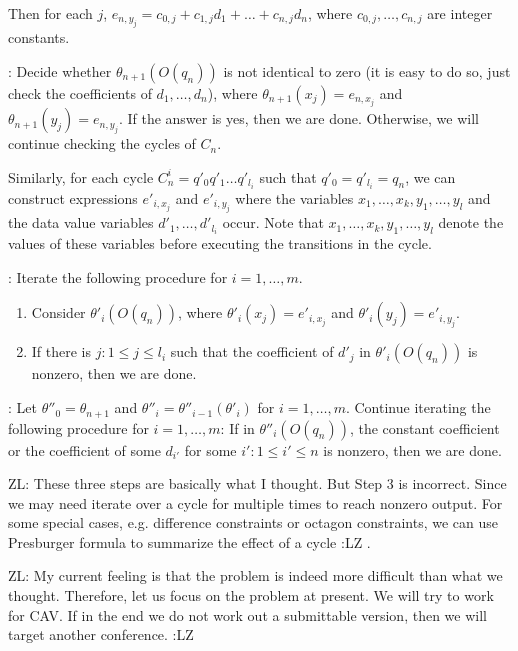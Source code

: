 \documentclass[runningheads,a4paper]{llncs}
\newcommand{\zhilin}[1]{\color{cyan} {ZL: #1 :LZ} \color{black}}
\begin{document}
Then for each $j$, $e_{n,y_j} = c_{0,j} + c_{1,j} d_1 + \dots + c_{n,j} d_n$, where $c_{0,j},\dots, c_{n,j}$ are integer constants.

\smallskip

: Decide whether $\theta_{n+1}(O(q_n))$ is not identical to zero (it is easy to do so, just check the coefficients of $d_1,\dots,d_n$), where $\theta_{n+1}(x_j)=e_{n,x_j}$ and $\theta_{n+1}(y_j)=e_{n,y_j}$. If the answer is yes, then we are done. Otherwise, we will continue checking the cycles of $C_n$.

Similarly, for each cycle $C^i_n = q'_0 q'_1 \dots q'_{l_i}$ such that $q'_0 = q'_{l_i}=q_n$, we can construct expressions $e'_{i,x_j}$ and $e'_{i,y_j}$ where the variables $x_1,\dots,x_k,y_1,\dots,y_l$ and the data value variables $d'_1,\dots,d'_{l_i}$ occur. Note that $x_1,\dots,x_k,y_1,\dots,y_l$ denote the values of these variables before executing the transitions in the cycle.

\smallskip

: Iterate the following procedure for $i = 1, \dots, m$.
\begin{enumerate}
\item Consider $\theta'_i(O(q_n))$, where $\theta'_i(x_j)=e'_{i,x_j}$ and $\theta'_i(y_j)=e'_{i,y_j}$. 
%
\item If there is $j: 1 \le j \le l_i$ such that the coefficient of $d'_j$ in $\theta'_i(O(q_n))$ is nonzero, then we are done. 
\end{enumerate}

\smallskip

: Let $\theta''_0=\theta_{n+1}$ and $\theta''_i = \theta''_{i-1}(\theta'_i)$ for $i = 1, \dots, m$.  Continue iterating the following procedure for $i = 1, \dots, m$:   If in $\theta''_i(O(q_n))$, the constant coefficient or the coefficient of some $d_{i'}$ for some $i': 1 \le i' \le n$ is nonzero, then we are done. 

\zhilin{These three steps are basically what I thought. But Step 3 is incorrect. Since we may need iterate over a cycle for multiple times to reach nonzero output. For some special cases, e.g. difference constraints or octagon constraints, we can use Presburger formula to summarize the effect of a cycle}.

\zhilin{My current feeling is that the problem is indeed more difficult than what we thought. Therefore, let us focus on the problem at present. We will try to work for CAV. If in the end we do not work out a submittable version, then we will target another conference.}
\end{document}
